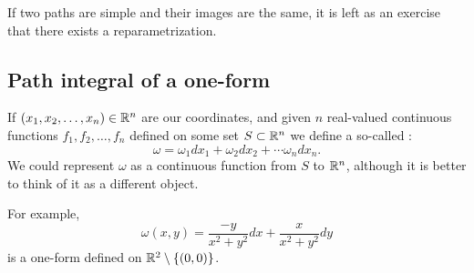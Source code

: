 
If two paths are simple and their images are the same, it is
left as an exercise that there exists a reparametrization.

\subsection{Path integral of a one-form}

\begin{defn}
If $(x_1,x_2,\ldots,x_n) \in {\mathbb{R}}^n$ are our coordinates, and
given $n$ real-valued continuous functions $f_1,f_2,\ldots,f_n$ defined on some set $S \subset {\mathbb{R}}^n$ we
define a so-called \emph{}:
\begin{equation*}
\omega = \omega_1 dx_1 + \omega_2 dx_2 + \cdots \omega_n dx_n .
\end{equation*}
We could represent $\omega$ as a continuous function from $S$ to ${\mathbb{R}}^n$, although it is
better to think of it as a different object.
\end{defn}

\begin{example}
For example,
\begin{equation*}
\omega(x,y) = \frac{-y}{x^2+y^2} dx + \frac{x}{x^2+y^2} dy
\end{equation*}
is a one-form defined on ${\mathbb{R}}^2 \setminus \{ (0,0) \}$.
\end{example}

